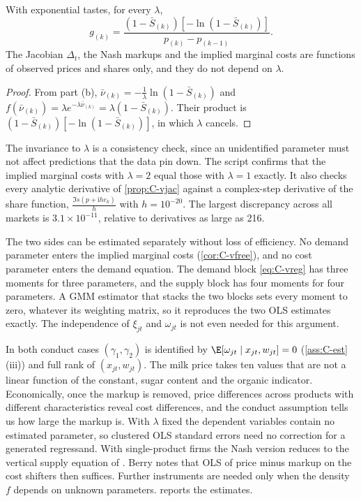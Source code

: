 \begin{corollary}\label{cor:C-vfree}
With exponential tastes, for every $\lambda$,
\[
  g_{(k)} = \frac{(1 - \bar S_{(k)})\left[-\ln(1 - \bar S_{(k)})\right]}{p_{(k)} - p_{(k-1)}} .
\]
The Jacobian $\Delta_t$, the Nash markups and the implied marginal costs are functions of observed prices
and shares only, and they do not depend on $\lambda$.
\end{corollary}

\begin{proof}
From part (b), $\bar\nu_{(k)} = -\frac{1}{\lambda}\ln(1 - \bar S_{(k)})$ and
$f(\bar\nu_{(k)}) = \lambda e^{-\lambda\bar\nu_{(k)}} = \lambda(1 - \bar S_{(k)})$. Their product is
$(1 - \bar S_{(k)})\left[-\ln(1 - \bar S_{(k)})\right]$, in which $\lambda$ cancels.
\end{proof}

The invariance to $\lambda$ is a consistency check, since an unidentified parameter must not affect predictions that the
data pin down. The script confirms that the implied marginal costs with $\lambda = 2$ equal those with $\lambda = 1$
exactly. It also checks every analytic derivative of \cref{prop:C-vjac} against a complex-step derivative of the share
function, $\frac{\Im s(p + \mathrm{i}he_k)}{h}$ with $h = 10^{-20}$. The largest discrepancy across all markets is
$3.1\times10^{-11}$, relative to derivatives as large as 216.

The two sides can be estimated separately without loss of efficiency. No demand parameter enters the implied marginal
costs (\cref{cor:C-vfree}), and no cost parameter enters the demand equation. The demand block \eqref{eq:C-vreg} has three
moments for three parameters, and the supply block has four moments for four parameters. A GMM estimator that stacks
the two blocks sets every moment to zero, whatever its weighting matrix, so it reproduces the two OLS estimates exactly.
The independence of $\xi_{jt}$ and $\omega_{jt}$ is not even needed for this argument.

In both conduct cases $(\gamma_1, \gamma_2)$ is identified by $\E[\omega_{jt} \mid x_{jt}, w_{jt}] = 0$
(\cref{ass:C-est}(iii)) and full rank of $(x_{jt}, w_{jt})$. The milk price takes ten values that are not a linear
function of the constant, sugar content and the organic indicator. Economically, once the markup is removed, price
differences across products with different characteristics reveal cost differences, and the conduct assumption tells
us how large the markup is. With $\lambda$ fixed the dependent variables contain no estimated parameter, so clustered OLS
standard errors need no correction for a generated regressand. With single-product firms the Nash version reduces to the
vertical supply equation of \citet[eq.~32, p.~255]{Berry1994}. Berry notes that OLS of price minus markup on the cost shifters then suffices. Further
instruments are needed only when the density $f$ depends on unknown parameters.  reports the
estimates.

